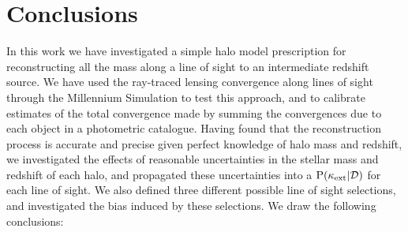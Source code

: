 \documentclass[useAMS,usenatbib,a4paper]{mn2e}
\begin{document}
\section{Conclusions}
\label{sec:conclude}

In this work we have investigated a simple halo model prescription for
reconstructing all the mass along a line of sight to an intermediate redshift
source. We have used the ray-traced lensing convergence along lines of sight
through the Millennium Simulation to test this approach, and to calibrate
estimates of the total convergence made by summing the convergences due to
each object in a photometric catalogue. Having found that the reconstruction
process is accurate and precise given perfect knowledge of halo mass and redshift, we
investigated the effects of reasonable uncertainties in the stellar mass and
redshift of each halo, and propagated these uncertainties into a
${\rm P}(\kappa_{\rm ext}|{\mathcal{D}})$ for each line of sight. We also defined three different
possible line of sight selections, and investigated the bias induced by these
selections. We draw the following conclusions:
\end{document}
